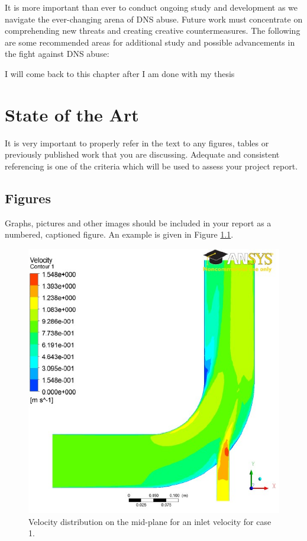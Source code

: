 It is more important than ever to conduct ongoing study and development as we navigate the ever-changing arena of DNS abuse. Future work must concentrate on comprehending new threats and creating creative countermeasures. The following are some recommended areas for additional study and possible advancements in the fight against DNS abuse:

I will come back to this chapter after I am done with my thesis 

\chapter{State of the Art}

It is very important to properly refer in the text to any figures, tables or previously published work that you are discussing. Adequate and consistent referencing is one of the criteria which will be used to assess your project report.

\section{Figures}
Graphs, pictures and other images should be included in your report as a numbered, captioned figure. An example is given in Figure \ref{veldis}.

\begin{figure}[h]
      \centering
      \includegraphics{background/5e1-1.pdf}
      \caption{Velocity distribution on the mid-plane for an inlet velocity for case 1.}
      \label{veldis}
\end{figure}

